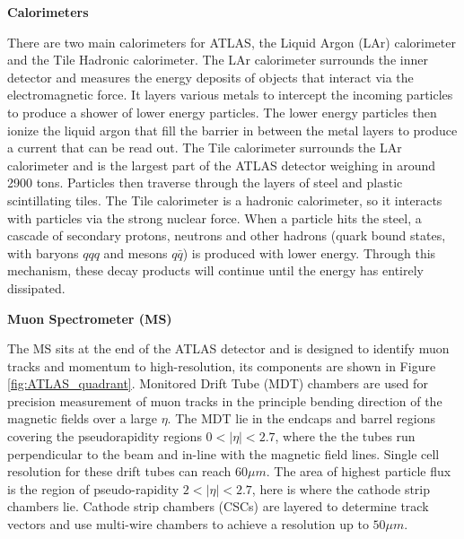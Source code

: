 \pagebreak
\noindent\textbf{Calorimeters}

There are two main calorimeters for ATLAS, the Liquid Argon (LAr) calorimeter and the Tile Hadronic calorimeter.
The LAr calorimeter surrounds the inner detector and measures the energy deposits of objects that interact via the electromagnetic force. 
It layers various metals to intercept the incoming particles to produce a shower of lower energy particles. 
The lower energy particles then ionize the liquid argon that fill the barrier in between the metal layers to produce a current that can be read out.
The Tile calorimeter surrounds the LAr calorimeter and is the largest part of the ATLAS detector weighing in around 2900 tons. 
Particles then traverse through the layers of steel and plastic scintillating tiles. 
The Tile calorimeter is a hadronic calorimeter, so it interacts with particles via the strong nuclear force. 
When a particle hits the steel, a cascade of secondary protons, neutrons and other hadrons (quark bound states, with baryons $qqq$ and mesons $q\bar{q}$) is produced with lower energy. 
Through this mechanism, these decay products will continue until the energy has entirely dissipated.

\noindent\textbf{Muon Spectrometer (MS)}

The MS sits at the end of the ATLAS detector and is designed to identify muon tracks and momentum to high-resolution, its components are shown in Figure \ref{fig:ATLAS_quadrant}.
Monitored Drift Tube (MDT) chambers are used for precision measurement of muon tracks in the principle bending direction of the magnetic fields over a large $\eta$.
The MDT lie in the endcaps and barrel regions covering the pseudorapidity regions $0 < |\eta| < 2.7$, where the the tubes run perpendicular to the beam and in-line with the magnetic field lines.
Single cell resolution for these drift tubes can reach $60 \mu m$.\cite{ATLAS_Tech_Proposal}
The area of highest particle flux is the region of pseudo-rapidity $2 < |\eta| < 2.7$, here is where the cathode strip chambers lie.\cite{muonSpec}
Cathode strip chambers (CSCs) are layered to determine track vectors and use multi-wire chambers to achieve a resolution up to $50 \mu m$. 

